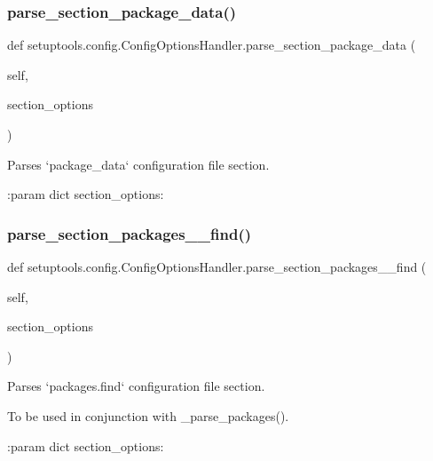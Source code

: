 \subsubsection{\texorpdfstring{parse\+\_\+section\+\_\+package\+\_\+data()}{parse\_section\_package\_data()}}
{\footnotesize\ttfamily def setuptools.\+config.\+Config\+Options\+Handler.\+parse\+\_\+section\+\_\+package\+\_\+data (\begin{DoxyParamCaption}\item[{}]{self,  }\item[{}]{section\+\_\+options }\end{DoxyParamCaption})}

\begin{DoxyVerb}Parses `package_data` configuration file section.

:param dict section_options:
\end{DoxyVerb}
 \mbox{\label{classsetuptools_1_1config_1_1ConfigOptionsHandler_afed6ee3f1ec81344d74bdf4628e4c46c}} 
\subsubsection{\texorpdfstring{parse\+\_\+section\+\_\+packages\+\_\+\+\_\+find()}{parse\_section\_packages\_\_find()}}
{\footnotesize\ttfamily def setuptools.\+config.\+Config\+Options\+Handler.\+parse\+\_\+section\+\_\+packages\+\_\+\+\_\+find (\begin{DoxyParamCaption}\item[{}]{self,  }\item[{}]{section\+\_\+options }\end{DoxyParamCaption})}

\begin{DoxyVerb}Parses `packages.find` configuration file section.

To be used in conjunction with _parse_packages().

:param dict section_options:
\end{DoxyVerb}
 \mbox{\label{classsetuptools_1_1config_1_1ConfigOptionsHandler_a84db64d7a8a64c2816c2967a1ba1a486}} 
